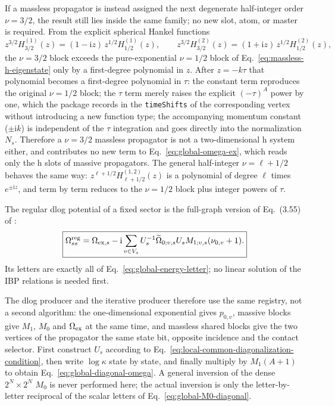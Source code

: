\documentclass[11pt,a4paper]{article}
\newcommand{\ii}{\mathrm i}
\begin{document}
If a massless propagator is instead assigned the next degenerate half-integer order $\nu=3/2$, the
result still lies inside the same family; no new slot, atom, or master is required. From the explicit
spherical Hankel functions
\begin{equation}
 z^{3/2}H^{(1)}_{3/2}(z)=(1-\ii z)\,z^{1/2}H^{(1)}_{1/2}(z),\qquad
 z^{3/2}H^{(2)}_{3/2}(z)=(1+\ii z)\,z^{1/2}H^{(2)}_{1/2}(z),
 \label{eq:half-integer-family-nu32}
\end{equation}
the $\nu=3/2$ block exceeds the pure-exponential $\nu=1/2$ block of Eq.~\eqref{eq:massless-h-eigenstate}
only by a first-degree polynomial in $z$. After $z=-k\tau$ that polynomial becomes a first-degree
polynomial in $\tau$: the constant term reproduces the original $\nu=1/2$ block; the $\tau$ term merely
raises the explicit $(-\tau)^A$ power by one, which the package records in the \texttt{timeShifts} of the
corresponding vertex without introducing a new function type; the accompanying momentum constant
($\pm\ii k$) is independent of the $\tau$ integration and goes directly into the normalization $N_s$.
Therefore a $\nu=3/2$ massless propagator is not a two-dimensional h system either, and contributes no new
term to Eq.~\eqref{eq:global-omega-ex}, which reads only the h slots of massive propagators. The general
half-integer $\nu=\ell+1/2$ behaves the same way: $z^{\ell+1/2}H^{(1,2)}_{\ell+1/2}(z)$ is a polynomial of
degree $\ell$ times $e^{\pm\ii z}$, and term by term reduces to the $\nu=1/2$ block plus integer powers of
$\tau$.

The regular dlog potential of a fixed sector is the full-graph version of Eq.~(3.55) of \cite{Chen:2023eic}:
\begin{equation}
 \boxed{
 \Omega_{ss}^{\rm reg}
 =\Omega_{{\rm ex},s}
 -\ii\sum_{v\in V_s}
 U_s^{-1}\widetilde\Omega_{0;v,s}U_s
 M_{1;v,s}(\nu_{0,v}+1).
 }
 \label{eq:global-diagonal-omega}
\end{equation}
Its letters are exactly all of Eq.~\eqref{eq:global-energy-letter}; no linear solution of the IBP relations is needed first.

The dlog producer and the iterative producer therefore use the same registry, not a second algorithm: the one-dimensional exponential gives $p_{0,v}$, massive blocks give $M_1$, $M_0$ and $\Omega_{\rm ex}$ at the same time, and massless shared blocks give the two vertices of the propagator the same state bit, opposite incidence and the contact selector. First construct $U_s$ according to Eq.~\eqref{eq:local-common-diagonalization-condition}, then write $\log\kappa$ state by state, and finally multiply by $M_1(A+1)$ to obtain Eq.~\eqref{eq:global-diagonal-omega}. A general inversion of the dense $2^N\times2^N$ $M_0$ is never performed here; the actual inversion is only the letter-by-letter reciprocal of the scalar letters of Eq.~\eqref{eq:global-M0-diagonal}.
\end{document}

